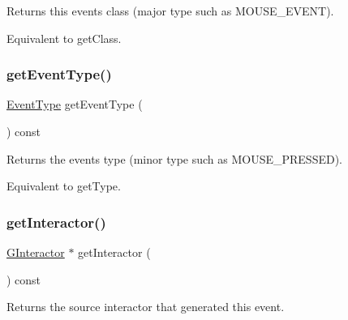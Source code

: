 Returns this event\textquotesingle{}s class (major type such as M\+O\+U\+S\+E\+\_\+\+E\+V\+E\+NT). 

Equivalent to get\+Class. \mbox{\label{classsgl_1_1GEvent_a404fe4b126a8443600109a62ef7ce6a2}} 
\subsubsection{\texorpdfstring{get\+Event\+Type()}{getEventType()}}
{\footnotesize\ttfamily \mbox{\hyperlink{namespacesgl_a2628ea8d12e8b2563c32f05dc7fff6fa}{Event\+Type}} get\+Event\+Type (\begin{DoxyParamCaption}{ }\end{DoxyParamCaption}) const\hspace{0.3cm}{\ttfamily [virtual]}}



Returns the event\textquotesingle{}s type (minor type such as M\+O\+U\+S\+E\+\_\+\+P\+R\+E\+S\+S\+ED). 

Equivalent to get\+Type. \mbox{\label{classsgl_1_1GEvent_ac8998a7ac699a98fbdc125ef0f3d64f1}} 
\subsubsection{\texorpdfstring{get\+Interactor()}{getInteractor()}}
{\footnotesize\ttfamily \mbox{\hyperlink{classsgl_1_1GInteractor}{G\+Interactor}} $\ast$ get\+Interactor (\begin{DoxyParamCaption}{ }\end{DoxyParamCaption}) const\hspace{0.3cm}{\ttfamily [virtual]}}



Returns the source interactor that generated this event. 

\mbox{\label{classsgl_1_1GEvent_ab3589ee7d7005f6a323ff2c968f82038}} 
